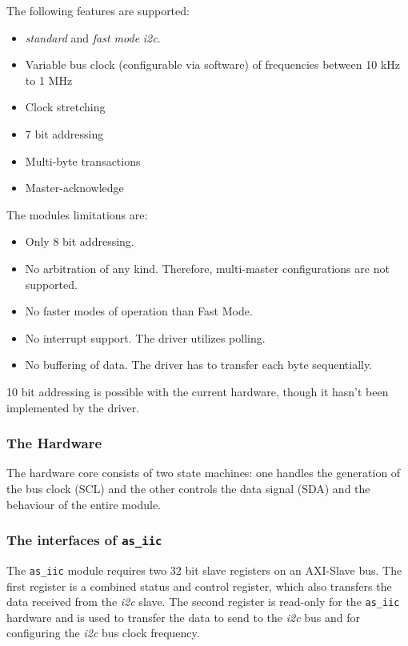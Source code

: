 The following features are supported:

\begin{itemize}
	\item \textit{standard} and \textit{fast mode} \textit{i2c}.
	\item Variable bus clock (configurable via software) of frequencies between 10 kHz to 1 MHz
	\item Clock stretching
	\item 7 bit addressing
	\item Multi-byte transactions
	\item Master-acknowledge
\end{itemize}

\bigskip

The modules limitations are:

\begin{itemize}
	\item Only 8 bit addressing.
	\item No arbitration of any kind. Therefore, multi-master configurations are not supported.
	\item No faster modes of operation than Fast Mode.
	\item No interrupt support. The driver utilizes polling.
	\item No buffering of data. The driver has to transfer each byte sequentially.
\end{itemize}

10 bit addressing is possible with the current hardware, though it hasn't been implemented by the driver.

\subsubsection{The Hardware}

The hardware core consists of two state machines: one handles the generation of the bus clock (SCL) and the other controls the data signal (SDA) and the behaviour of the entire module.

\subsubsection*{The interfaces of \texttt{as\_iic}}

The \texttt{as\_iic} module requires two 32 bit slave registers on an AXI-Slave bus.
The first register is a combined status and control register, which also transfers the data received from the \textit{i2c} slave. 
The second register is read-only for the \texttt{as\_iic} hardware and is used to transfer the data to send to the \textit{i2c} bus and for configuring the \textit{i2c} bus clock frequency.

